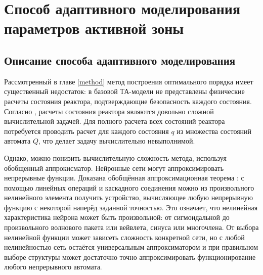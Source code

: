 \chapter{Способ адаптивного моделирования параметров активной зоны}

\section{Описание способа адаптивного моделирования}

Рассмотренный в главе \ref{method} метод построения оптимального порядка имеет существенный недостаток: в базовой ТА-модели не представлены физические расчеты состояния реактора, подтверждающие безопасность каждого состояния.
Согласно \cite{reactor-calc}, расчеты состояния реактора являются довольно сложной вычислительной задачей.
Для полного расчета всех состояний реактора потребуется проводить расчет для каждого состояния $q$ из множества состояний автомата $Q$, что делает задачу вычислительно невыполнимой.

Однако, можно понизить вычислительную сложность метода, используя обобщенный аппрокисматор.
Нейронные сети могут аппроксимировать непрерывные функции. 
Доказана обобщённая аппроксимационная теорема \cite{neuron-gorban}: с помощью линейных операций и каскадного соединения можно из произвольного нелинейного элемента получить устройство, вычисляющее любую непрерывную функцию с некоторой наперёд заданной точностью. 
Это означает, что нелинейная характеристика нейрона может быть произвольной: от сигмоидальной до произвольного волнового пакета или вейвлета, синуса или многочлена. 
От выбора нелинейной функции может зависеть сложность конкретной сети, но с любой нелинейностью сеть остаётся универсальным аппроксиматором и при правильном выборе структуры может достаточно точно аппроксимировать функционирование любого непрерывного автомата.

